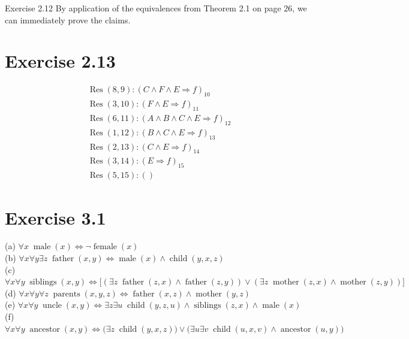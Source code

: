 \documentclass[10pt]{book}
\begin{document}
Exercise 2.12 By application of the equivalences from Theorem 2.1 on page 26, we can immediately prove the claims.

\section{Exercise 2.13}
$$
\begin{aligned}
& \operatorname{Res}(8,9):(C \wedge F \wedge E \Rightarrow f)_{10} \\
& \operatorname{Res}(3,10):(F \wedge E \Rightarrow f)_{11} \\
& \operatorname{Res}(6,11):(A \wedge B \wedge C \wedge E \Rightarrow f)_{12} \\
& \operatorname{Res}(1,12):(B \wedge C \wedge E \Rightarrow f)_{13} \\
& \operatorname{Res}(2,13):(C \wedge E \Rightarrow f)_{14} \\
& \operatorname{Res}(3,14):(E \Rightarrow f)_{15} \\
& \operatorname{Res}(5,15):()
\end{aligned}
$$

\section{Exercise 3.1}
(a) $\forall x\; \operatorname{male}(x) \Leftrightarrow \neg \operatorname{female}(x)$\\
(b) $\forall x \forall y \exists z\; \operatorname{father}(x,y) \Leftrightarrow \operatorname{male}(x) \wedge \operatorname{child}(y,x,z)$\\
(c) $\forall x \forall y\; \operatorname{siblings}(x,y) \Leftrightarrow \big[(\exists z\; \operatorname{father}(z,x) \wedge \operatorname{father}(z,y)) \vee (\exists z\; \operatorname{mother}(z,x) \wedge \operatorname{mother}(z,y))\big]$\\
(d) $\forall x \forall y \forall z\; \operatorname{parents}(x,y,z) \Leftrightarrow \operatorname{father}(x,z) \wedge \operatorname{mother}(y,z)$\\
(e) $\forall x \forall y\; \operatorname{uncle}(x,y) \Leftrightarrow \exists z \exists u\; \operatorname{child}(y,z,u) \wedge \operatorname{siblings}(z,x) \wedge \operatorname{male}(x)$\\
(f) $\forall x \forall y\; \operatorname{ancestor}(x,y) \Leftrightarrow \big(\exists z\; \operatorname{child}(y,x,z)\big) \vee \big(\exists u \exists v\; \operatorname{child}(u,x,v) \wedge \operatorname{ancestor}(u,y)\big)$
\end{document}
